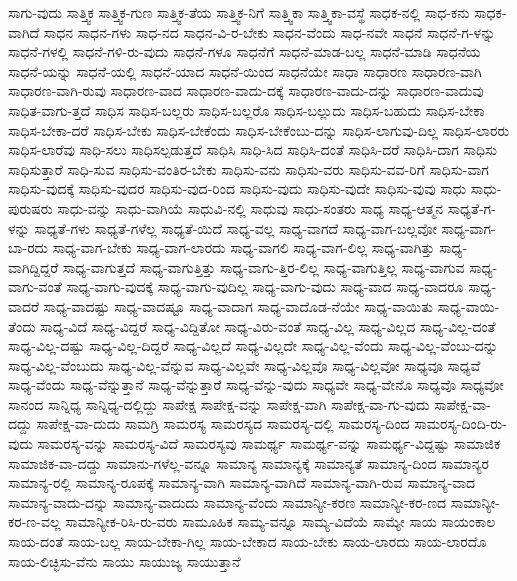 {ಸಾಗು-ವುದು
ಸಾತ್ತ್ವಿಕ
ಸಾತ್ತ್ವಿಕ-ಗುಣ
ಸಾತ್ತ್ವಿಕ-ತೆಯ
ಸಾತ್ತ್ವಿಕ-ನಿಗೆ
ಸಾತ್ತ್ವಿಕಾ
ಸಾತ್ತ್ವಿಕಾ-ವಸ್ಥೆ
ಸಾಧಕ-ನಲ್ಲಿ
ಸಾಧ-ಕನು
ಸಾಧಕ-ವಾಗಿದೆ
ಸಾಧನ
ಸಾಧನ-ಗಳು
ಸಾಧ-ನದ
ಸಾಧನ-ವಿ-ರ-ಬೇಕು
ಸಾಧನ-ವೆಂದು
ಸಾಧ-ನವೇ
ಸಾಧನೆ
ಸಾಧನೆ-ಗ-ಳನ್ನು
ಸಾಧನೆ-ಗಳಲ್ಲಿ
ಸಾಧನೆ-ಗಳಿ-ರು-ವುದು
ಸಾಧನೆ-ಗಳೂ
ಸಾಧನೆಗೆ
ಸಾಧನೆ-ಮಾಡ-ಬಲ್ಲ
ಸಾಧನೆ-ಮಾಡಿ
ಸಾಧನೆಯ
ಸಾಧನೆ-ಯನ್ನು
ಸಾಧನೆ-ಯಲ್ಲಿ
ಸಾಧನೆ-ಯಾದ
ಸಾಧನೆ-ಯಿಂದ
ಸಾಧನೆಯೇ
ಸಾಧಾ
ಸಾಧಾರಣ
ಸಾಧಾರಣ-ವಾಗಿ
ಸಾಧಾರಣ-ವಾಗಿ-ರುವು
ಸಾಧಾರಣ-ವಾದ
ಸಾಧಾರಣ-ವಾದು-ದಕ್ಕೆ
ಸಾಧಾರಣ-ವಾದು-ದನ್ನು
ಸಾಧಾರಣ-ವಾದುವು
ಸಾಧಿತ-ವಾಗು-ತ್ತದೆ
ಸಾಧಿಸ
ಸಾಧಿಸ-ಬಲ್ಲರು
ಸಾಧಿಸ-ಬಲ್ಲರೊ
ಸಾಧಿಸ-ಬಲ್ಲುದು
ಸಾಧಿಸ-ಬಹುದು
ಸಾಧಿಸ-ಬೇಕಾ
ಸಾಧಿಸ-ಬೇಕಾ-ದರೆ
ಸಾಧಿಸ-ಬೇಕು
ಸಾಧಿಸ-ಬೇಕೆಂದು
ಸಾಧಿಸ-ಬೇಕೆಂಬು-ದನ್ನು
ಸಾಧಿಸ-ಲಾಗುವು-ದಿಲ್ಲ
ಸಾಧಿಸ-ಲಾರರು
ಸಾಧಿಸ-ಲಾರೆವು
ಸಾಧಿ-ಸಲು
ಸಾಧಿಸಲ್ಪಡುತ್ತದೆ
ಸಾಧಿಸಿ
ಸಾಧಿ-ಸಿದ
ಸಾಧಿಸಿ-ದಂತೆ
ಸಾಧಿಸಿ-ದರೆ
ಸಾಧಿಸಿ-ದಾಗ
ಸಾಧಿಸು
ಸಾಧಿಸುತ್ತಾರೆ
ಸಾಧಿ-ಸುವ
ಸಾಧಿಸು-ವಂತಿರ-ಬೇಕು
ಸಾಧಿಸು-ವನು
ಸಾಧಿಸು-ವರು
ಸಾಧಿಸು-ವವ-ರಿಗೆ
ಸಾಧಿಸು-ವಾಗ
ಸಾಧಿಸು-ವುದಕ್ಕೆ
ಸಾಧಿಸು-ವುದರ
ಸಾಧಿಸು-ವುದ-ರಿಂದ
ಸಾಧಿಸು-ವುದು
ಸಾಧಿಸು-ವುದೇ
ಸಾಧಿಸು-ವುವು
ಸಾಧು
ಸಾಧು-ಪುರುಷರು
ಸಾಧು-ವನ್ನು
ಸಾಧು-ವಾಗಿಯೆ
ಸಾಧುವಿ-ನಲ್ಲಿ
ಸಾಧುವು
ಸಾಧು-ಸಂತರು
ಸಾಧ್ಯ
ಸಾಧ್ಯ-ಆತ್ಮನ
ಸಾಧ್ಯತೆ-ಗ-ಳನ್ನು
ಸಾಧ್ಯತೆ-ಗಳು
ಸಾಧ್ಯತೆ-ಗಳೆಲ್ಲ
ಸಾಧ್ಯತೆ-ಯಿದೆ
ಸಾಧ್ಯ-ವಲ್ಲ
ಸಾಧ್ಯ-ವಾಗದೆ
ಸಾಧ್ಯ-ವಾಗ-ಬಲ್ಲವೋ
ಸಾಧ್ಯ-ವಾಗ-ಬಾ-ರದು
ಸಾಧ್ಯ-ವಾಗ-ಬೇಕು
ಸಾಧ್ಯ-ವಾಗ-ಲಾರದು
ಸಾಧ್ಯ-ವಾಗಲಿ
ಸಾಧ್ಯ-ವಾಗ-ಲಿಲ್ಲ
ಸಾಧ್ಯ-ವಾಗಿತ್ತು
ಸಾಧ್ಯ-ವಾಗಿದ್ದಿದ್ದರೆ
ಸಾಧ್ಯ-ವಾಗುತ್ತದೆ
ಸಾಧ್ಯ-ವಾಗುತ್ತಿತ್ತು
ಸಾಧ್ಯ-ವಾಗು-ತ್ತಿರ-ಲಿಲ್ಲ
ಸಾಧ್ಯ-ವಾಗುತ್ತಿಲ್ಲ
ಸಾಧ್ಯ-ವಾಗುವ
ಸಾಧ್ಯ-ವಾಗು-ವಂತೆ
ಸಾಧ್ಯ-ವಾಗು-ವುದಕ್ಕೆ
ಸಾಧ್ಯ-ವಾಗು-ವುದಿಲ್ಲ
ಸಾಧ್ಯ-ವಾಗು-ವುದು
ಸಾಧ್ಯ-ವಾದ
ಸಾಧ್ಯ-ವಾದರೂ
ಸಾಧ್ಯ-ವಾದರೆ
ಸಾಧ್ಯ-ವಾದಷ್ಟು
ಸಾಧ್ಯ-ವಾದಷ್ಟೂ
ಸಾಧ್ಯ-ವಾದಾಗ
ಸಾಧ್ಯ-ವಾದೊಡ-ನೆಯೇ
ಸಾಧ್ಯ-ವಾಯಿತು
ಸಾಧ್ಯ-ವಾಯಿ-ತೆಂದು
ಸಾಧ್ಯ-ವಿದೆ
ಸಾಧ್ಯ-ವಿದ್ದರೆ
ಸಾಧ್ಯ-ವಿದ್ದಿತೋ
ಸಾಧ್ಯ-ವಿರು-ವಂತೆ
ಸಾಧ್ಯ-ವಿಲ್ಲ
ಸಾಧ್ಯ-ವಿಲ್ಲದ
ಸಾಧ್ಯ-ವಿಲ್ಲ-ದಂತೆ
ಸಾಧ್ಯ-ವಿಲ್ಲ-ದಷ್ಟು
ಸಾಧ್ಯ-ವಿಲ್ಲ-ದಿದ್ದರೆ
ಸಾಧ್ಯ-ವಿಲ್ಲದೆ
ಸಾಧ್ಯ-ವಿಲ್ಲದೇ
ಸಾಧ್ಯ-ವಿಲ್ಲ-ವೆಂದು
ಸಾಧ್ಯ-ವಿಲ್ಲ-ವೆಂಬು-ದನ್ನು
ಸಾಧ್ಯ-ವಿಲ್ಲ-ವೆಂಬುದು
ಸಾಧ್ಯ-ವಿಲ್ಲ-ವೆನ್ನುವ
ಸಾಧ್ಯ-ವಿಲ್ಲವೇ
ಸಾಧ್ಯ-ವಿಲ್ಲವೊ
ಸಾಧ್ಯ-ವಿಲ್ಲವೋ
ಸಾಧ್ಯವೂ
ಸಾಧ್ಯವೆ
ಸಾಧ್ಯ-ವೆಂದು
ಸಾಧ್ಯ-ವೆನ್ನುತ್ತಾನೆ
ಸಾಧ್ಯ-ವೆನ್ನುತ್ತಾರೆ
ಸಾಧ್ಯ-ವೆನ್ನು-ವುದು
ಸಾಧ್ಯವೇ
ಸಾಧ್ಯ-ವೇನೊ
ಸಾಧ್ಯವೊ
ಸಾಧ್ಯವೋ
ಸಾನಂದ
ಸಾನ್ನಿಧ್ಯ
ಸಾನ್ನಿಧ್ಯ-ದಲ್ಲಿದ್ದು
ಸಾಪೇಕ್ಷ
ಸಾಪೇಕ್ಷ-ವನ್ನು
ಸಾಪೇಕ್ಷ-ವಾಗಿ
ಸಾಪೇಕ್ಷ-ವಾ-ಗು-ವುದು
ಸಾಪೇಕ್ಷ-ವಾ-ದದ್ದು
ಸಾಪೇಕ್ಷ-ವಾ-ದುದು
ಸಾಮಗ್ರಿ
ಸಾಮರಸ್ಯ
ಸಾಮರಸ್ಯದ
ಸಾಮರಸ್ಯ-ದಲ್ಲಿ
ಸಾಮರಸ್ಯ-ದಿಂದ
ಸಾಮರಸ್ಯ-ದಿಂದಿ-ರು-ವುದು
ಸಾಮರಸ್ಯ-ವನ್ನು
ಸಾಮರಸ್ಯ-ವಿದೆ
ಸಾಮರಸ್ಯವು
ಸಾಮರ್ಥ್ಯ
ಸಾಮರ್ಥ್ಯ-ವನ್ನು
ಸಾಮರ್ಥ್ಯ-ವಿದ್ದಷ್ಟು
ಸಾಮಾಜಿಕ
ಸಾಮಾಜಿಕ-ವಾ-ದದ್ದು
ಸಾಮಾನು-ಗಳೆಲ್ಲ-ವನ್ನೂ
ಸಾಮಾನ್ಯ
ಸಾಮಾನ್ಯಕ್ಕೆ
ಸಾಮಾನ್ಯತೆ
ಸಾಮಾನ್ಯ-ದಿಂದ
ಸಾಮಾನ್ಯರ
ಸಾಮಾನ್ಯ-ರಲ್ಲಿ
ಸಾಮಾನ್ಯ-ರೂಪಕ್ಕೆ
ಸಾಮಾನ್ಯ-ವಾಗಿ
ಸಾಮಾನ್ಯ-ವಾಗಿದೆ
ಸಾಮಾನ್ಯ-ವಾಗಿ-ರುವ
ಸಾಮಾನ್ಯ-ವಾದ
ಸಾಮಾನ್ಯ-ವಾದು-ದನ್ನು
ಸಾಮಾನ್ಯ-ವಾದುದು
ಸಾಮಾನ್ಯ-ವೆಂದು
ಸಾಮಾನ್ಯೀ-ಕರಣ
ಸಾಮಾನ್ಯೀ-ಕರ-ಣದ
ಸಾಮಾನ್ಯೀ-ಕರ-ಣ-ವಲ್ಲ
ಸಾಮಾನ್ಯೀಕ-ರಿಸಿ-ರು-ವರು
ಸಾಮೂಹಿಕ
ಸಾಮ್ಯ-ವನ್ನೂ
ಸಾಮ್ಯ-ವಿದೆಯೆ
ಸಾಮ್ಯೇ
ಸಾಯ
ಸಾಯಂಕಾಲ
ಸಾಯ-ದಂತೆ
ಸಾಯ-ಬಲ್ಲ
ಸಾಯ-ಬೇಕಾ-ಗಿಲ್ಲ
ಸಾಯ-ಬೇಕಾದ
ಸಾಯ-ಬೇಕು
ಸಾಯ-ಲಾರದು
ಸಾಯ-ಲಾರದೊ
ಸಾಯ-ಲಿಚ್ಛಿಸು-ವೆನು
ಸಾಯು
ಸಾಯುಜ್ಯ
ಸಾಯುತ್ತಾನೆ
}
